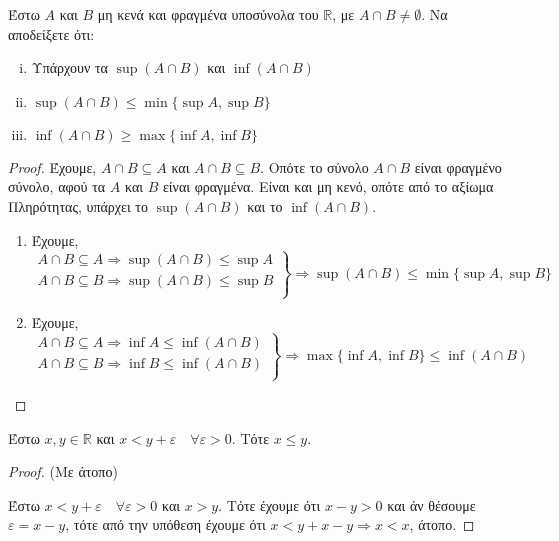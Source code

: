\begin{mybox3}
\begin{prop}
  Έστω $A$ και $B$ μη κενά και φραγμένα υποσύνολα του $ \mathbb{R} $, με 
  $ A \cap B \neq \emptyset $. Να αποδείξετε ότι:
  \begin{enumerate}[i)]
    \item Υπάρχουν τα $ \sup {(A \cap B)} $ και $ \inf {(A \cap B)} $
    \item $ \sup {(A \cap B)} \leq \min \{ \sup A, \sup B \} $
    \item $ \inf {(A \cap B)} \geq \max \{ \inf A, \inf B \} $
  \end{enumerate}
\end{prop}
\end{mybox3}
\begin{proof}
\item Έχουμε, $ A \cap B \subseteq A $ και $ A \cap B \subseteq B $. 
  Οπότε το σύνολο $ A \cap B $ είναι φραγμένο σύνολο, αφού τα $ A $ και $B$ 
  είναι φραγμένα. Είναι και μη κενό, οπότε από το αξίωμα Πληρότητας, 
  υπάρχει το $ \sup {(A \cap B)} $ και το $ \inf {(A \cap B)} $.
  \begin{enumerate}[label=\roman*),labelindent=0em,leftmargin=*]
    \item Έχουμε, 
      \[
        \left.
          \begin{matrix}
            A \cap B \subseteq A\! \Rightarrow\!\sup (A \cap B) \leq \sup A \\
            A \cap B \subseteq B\! \Rightarrow\!\sup (A \cap B) \leq \sup B \\
          \end{matrix} 
          \right\} \!\!\Rightarrow\!\sup {(A \cap B)}\!\leq\!\min \{ \sup\!A,
        \sup\!B \} 
      \]
    \item Έχουμε, 
      \[
        \left.
          \begin{matrix}
            A \cap B \subseteq A \Rightarrow \inf A \leq \inf (A \cap B) \\
            A \cap B \subseteq B \Rightarrow \inf B \leq \inf (A \cap B) \\
          \end{matrix} 
        \right\}\! \Rightarrow \max \{ \inf A, \inf B \} \leq \inf {(A \cap B)}
      \]
  \end{enumerate}
\end{proof}

\begin{lem}
  \label{lem:vare2}
  Έστω $ x,y \in \mathbb{R} $ και $ x<y+ \varepsilon \quad \forall \varepsilon >0 $. 
  Τότε $ x \leq y $.
\end{lem}
\begin{proof}(Με άτοπο)
\item {}
  Έστω $ x < y+ \varepsilon \quad \forall \varepsilon >0 $ και $ x>y $. Τότε 
  έχουμε ότι $ x-y>0 $ και άν θέσουμε  $ \varepsilon = x-y $, τότε από την 
  υπόθεση έχουμε ότι $ x< y+ x-y \Rightarrow x<x $, άτοπο.
\end{proof}

